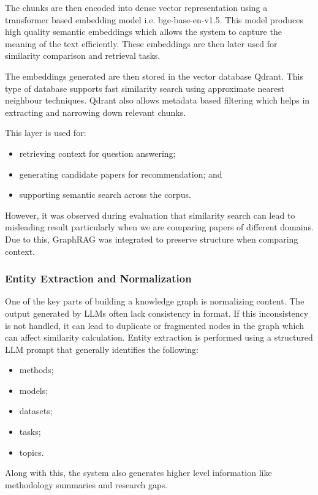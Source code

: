 \documentclass[10pt]{article}
\begin{document}
The chunks are then encoded into dense vector representation using a transformer based embedding model i.e. bge-base-en-v1.5. This model produces high quality semantic embeddings which allows the system to capture the meaning of the text efficiently. These embeddings are then later used for similarity comparison and retrieval tasks.

The embeddings generated are then stored in the vector database Qdrant. This type of database supports fast similarity search using approximate nearest neighbour techniques. Qdrant also allows metadata based filtering which helps in extracting and narrowing down relevant chunks.

This layer is used for:
\begin{itemize}[leftmargin=*,noitemsep]
\item retrieving context for question answering;
\item generating candidate papers for recommendation; and
\item supporting semantic search across the corpus.
\end{itemize}

However, it was observed during evaluation that similarity search can lead to misleading result particularly when we are comparing papers of different domains. Due to this, GraphRAG was integrated to preserve structure when comparing context.

\subsubsection{Entity Extraction and Normalization}
One of the key parts of building a knowledge graph is normalizing content. The output generated by LLMs often lack consistency in format. If this inconsistency is not handled, it can lead to duplicate or fragmented nodes in the graph which can affect similarity calculation. Entity extraction is performed using a structured LLM prompt that generally identifies the following:
\begin{itemize}[leftmargin=*,noitemsep]
\item methods;
\item models;
\item datasets;
\item tasks;
\item topics.
\end{itemize}

Along with this, the system also generates higher level information like methodology summaries and research gaps.
\end{document}
